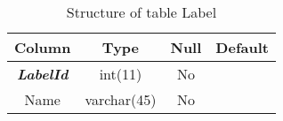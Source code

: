 %
%
\begin{longtable}{|c|c|c|c|} 
\caption{Structure of table Label} 
\label{tab:Label-structure} \\
\hline 
\multicolumn{1}{|c|}{\textbf{Column}} & \multicolumn{1}{|c|}{\textbf{Type}} & \multicolumn{1}{|c|}{\textbf{Null}} & \multicolumn{1}{|c|}{\textbf{Default}} \\ 
\hline
\textbf{\textit{LabelId}} & int(11) & No &  \\ 
\hline 
Name & varchar(45) & No &  \\ 
\hline 
\end{longtable}

%
%

%
%

%
%

